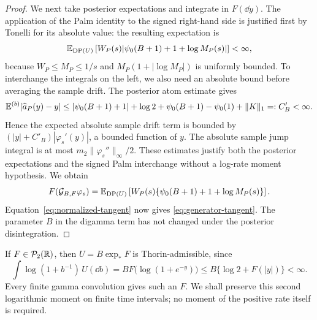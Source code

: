 \begin{proof}
We next take posterior expectations and integrate in $F(\dd y)$.
The application of the Palm identity to the signed right-hand side is justified first by Tonelli for its absolute value: the resulting expectation is
\[
 \mathbb E_{\operatorname{DP}(U)}\left[
 W_P(s)|\psi_0(B+1)+1+\log M_P(s)|\right]<\infty,
\]
because $W_P\leq M_P\leq1/s$ and $M_P(1+|\log M_P|)$ is uniformly bounded.
To interchange the integrals on the left, we also need an absolute bound before averaging the sample drift.
The posterior atom estimate gives
\begin{equation}
 \mathbb E^{(b)}|\widehat a_P(y)-y|
 \leq |\psi_0(B+1)+1|+\log2+\psi_0(B+1)-\psi_0(1)+\|K\|_1
 =:C'_B<\infty.
 \label{eq:absolute-posterior-drift}
\end{equation}
Hence the expected absolute sample drift term is bounded by $(|y|+C'_B)|\varphi_s'(y)|$, a bounded function of $y$.
The absolute sample jump integral is at most $m_2\|\varphi_s''\|_\infty/2$.
These estimates justify both the posterior expectations and the signed Palm interchange without a log-rate moment hypothesis.
We obtain
\[
 F(\mathcal G_{B,F}\varphi_s)
 =\mathbb E_{\operatorname{DP}(U)}\left[
 W_P(s)\{\psi_0(B+1)+1+\log M_P(s)\}\right].
\]
Equation~\eqref{eq:normalized-tangent} now gives \eqref{eq:generator-tangent}.
The parameter $B$ in the digamma term has not changed under the posterior disintegration.
\end{proof}

\begin{remark}
If $F\in\mathcal P_2(\mathbb R)$, then $U=B\exp_*F$ is Thorin-admissible, since
\begin{equation}
 \int\log(1+b^{-1})\,U(\dd b)
 =B F\bigl(\log(1+e^{-y})\bigr)
 \leq B\{\log2+F(|y|)\}<\infty.
 \label{eq:log-moment-admissibility}
\end{equation}
Every finite gamma convolution gives such an $F$.
We shall preserve this second logarithmic moment on finite time intervals; no moment of the positive rate itself is required.
\end{remark}
